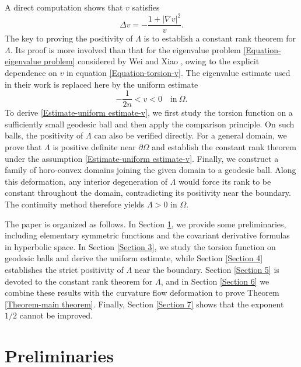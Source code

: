\documentclass[11pt]{amsart}
\numberwithin{theorem}{section}
\numberwithin{equation}{section}
\begin{document}
A direct computation shows that $v$ satisfies
\begin{equation}\label{Equation-torsion-v}
\Delta v=-\frac{1+|\nabla v|^2}{v}.
\end{equation}
The key to proving the positivity of $\Lambda$ is to establish a constant rank theorem for $\Lambda$. Its proof is more involved than that for the eigenvalue problem \eqref{Equation-eigenvalue problem} considered by Wei and Xiao \cite{Wei-Xiao2025}, owing to the explicit dependence on $v$ in equation \eqref{Equation-torsion-v}. The eigenvalue estimate used in their work is replaced here by the uniform estimate
\begin{equation}\label{Estimate-uniform estimate-v}
-\frac{1}{2n}<v<0\quad \mathrm{in}\ \Omega.
\end{equation}
To derive \eqref{Estimate-uniform estimate-v}, we first study the torsion function on a sufficiently small geodesic ball and then apply the comparison principle. On such balls, the positivity of $\Lambda$ can also be verified directly. For a general domain, we prove that $\Lambda$ is positive definite near $\partial\Omega$ and establish the constant rank theorem under the assumption \eqref{Estimate-uniform estimate-v}. Finally, we construct a family of horo-convex domains joining the given domain to a geodesic ball. Along this deformation, any interior degeneration of $\Lambda$ would force its rank to be constant throughout the domain, contradicting its positivity near the boundary. The continuity method therefore yields $\Lambda>0$ in $\Omega$.

The paper is organized as follows. In Section \ref{Section 2}, we provide some preliminaries, including elementary symmetric functions and the covariant derivative formulas in hyperbolic space. In Section \ref{Section 3}, we study the torsion function on geodesic balls and derive the uniform estimate, while Section \ref{Section 4} establishes the strict positivity of $\Lambda$ near the boundary. Section \ref{Section 5} is devoted to the constant rank theorem for $\Lambda$, and in Section \ref{Section 6} we combine these results with the curvature flow deformation to prove Theorem \ref{Theorem-main theorem}. Finally, Section \ref{Section 7} shows that the exponent $1/2$ cannot be improved.

\section{Preliminaries}\label{Section 2}
\end{document}
